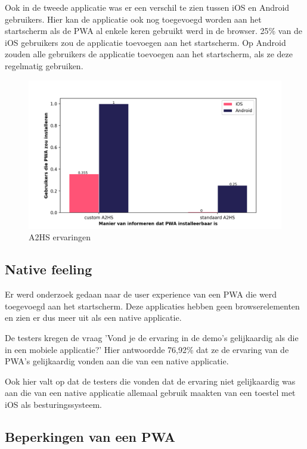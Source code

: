 		Ook in de tweede applicatie was er een verschil te zien tussen iOS en Android gebruikers.	
		Hier kan de applicatie ook nog toegevoegd worden aan het startscherm als de PWA al enkele keren gebruikt werd in de browser.
		25\% van de iOS gebruikers zou de applicatie toevoegen aan het startscherm. Op Android zouden alle gebruikers de applicatie toevoegen aan het startscherm, als ze deze regelmatig gebruiken. 
		
		
		\begin{figure}[H]
				\centering
				\includegraphics[width=120mm]{./img/A2HS_data.png}
				\caption{A2HS ervaringen}
			\end{figure}
		
		
	
	\subsection{Native feeling}
		
		Er werd onderzoek gedaan naar de user experience van een PWA die werd toegevoegd aan het startscherm. Deze applicaties hebben geen browserelementen en zien er dus meer uit als een native applicatie.
		
		
		De testers kregen de vraag 'Vond je de ervaring in de demo's gelijkaardig als die in een mobiele applicatie?' Hier antwoordde 76,92\% dat ze de ervaring van de PWA's gelijkaardig vonden aan die van een native applicatie.
		
		Ook hier valt op dat de testers die vonden dat de ervaring niet gelijkaardig was aan die van een native applicatie allemaal gebruik maakten van een toestel met iOS als besturingssysteem.
		
	\subsection{Beperkingen van een PWA}
	
